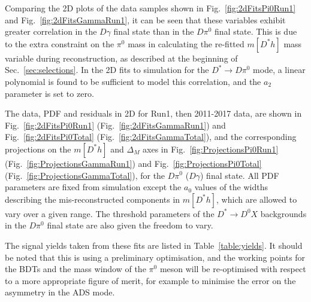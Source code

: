 \documentclass[oneside,12pt]{article}
\begin{document}
Comparing the 2D plots of the data samples shown in Fig.~\ref{fig:2dFitsPi0Run1}
and Fig.~\ref{fig:2dFitsGammaRun1}, it can be seen that these variables exhibit
greater correlation in the $D\gamma$ final state than in the $D\pi^0$ final
state. This is due to the extra constraint on the $\pi^0$ mass in calculating
the re-fitted $m[D^*h]$ mass variable during reconstruction, as described at the
beginning of Sec.~\ref{sec:selections}. In the 2D fits to simulation for the
$D^*\rightarrow D\pi^0$ mode, a linear polynomial is found to be
sufficient to model this correlation, and the $a_2$ parameter is set to zero.

The data, PDF and residuals in 2D for Run1, then 2011-2017 data, are shown in
Fig.~\ref{fig:2dFitsPi0Run1} (Fig.~\ref{fig:2dFitsGammaRun1}) and
Fig.~\ref{fig:2dFitsPi0Total} (Fig.~\ref{fig:2dFitsGammaTotal}), and the
corresponding projections on the $m[D^*h]$ and $\Delta_M$ axes in
Fig.~\ref{fig:ProjectionsPi0Run1} (Fig.~\ref{fig:ProjectionsGammaRun1}) and
Fig.~\ref{fig:ProjectionsPi0Total} (Fig.~\ref{fig:ProjectionsGammaTotal}), for
the $D\pi^0$ ($D\gamma$) final state. All PDF parameters are fixed from
simulation except the $a_0$ values of the widths describing the
mis-reconstructed components in $m[D^{*}h]$, which are allowed to vary over a
given range. The threshold parameters of the $D^{*}\rightarrow D^0X$ backgrounds
in the $D\pi^0$ final state are also given the freedom to vary.

The signal yields taken from these fits are listed in Table~\ref{table:yields}.
It should be noted that this is using a preliminary optimisation, and the
working points for the BDTs and the mass window of the $\pi^0$ meson will be
re-optimised with respect to a more appropriate figure of merit, for example to
minimise the error on the asymmetry in the ADS mode.

\vspace{-3mm}
\end{document}
